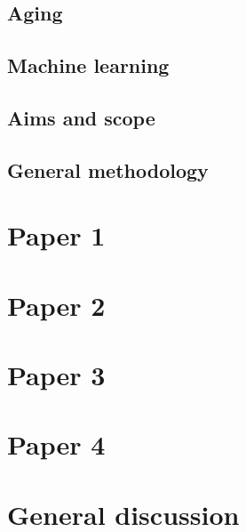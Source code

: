 \documentclass{book}
\begin{document}
    \section{Aging}
    \label{sec:theory}
        

    \section{Machine learning}
    \label{sec:theory}
     
    
    \section{Aims and scope}
    \label{sec:aims_scope}
    

    \section{General methodology}
    \label{sec:methods}
    


\chapter{Paper 1}
\label{chap:paper1}

\chapter{Paper 2}
\label{chap:paper2}

\chapter{Paper 3}
\label{chap:paper3}

\chapter{Paper 4}
\label{chap:paper4}

\chapter{General discussion}
\label{chap:discussion}

\printbibliography
\end{document}
